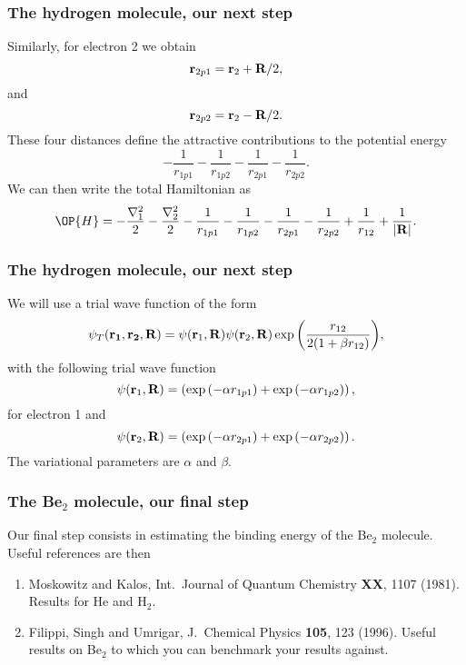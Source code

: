 \frame
{
  \frametitle{The hydrogen molecule, our next step}
\begin{small}
{\scriptsize
Similarly, for electron 2 we obtain
\[
{\bf r}_{2p1}={\bf r}_2+{\bf R}/2,
\]
and
\[
{\bf r}_{2p2}={\bf r}_2-{\bf R}/2.
\]
These four distances define the attractive contributions to the potential energy
\[
   -\frac{1}{r_{1p1}}-\frac{1}{r_{1p2}}-\frac{1}{r_{2p1}}-\frac{1}{r_{2p2}}.
\]
We can then write the total Hamiltonian as 
\[
   \OP{H}=-\frac{\nabla_1^2}{2}-\frac{\nabla_2^2}{2}
   -\frac{1}{r_{1p1}}-\frac{1}{r_{1p2}}-\frac{1}{r_{2p1}}-\frac{1}{r_{2p2}}
               +\frac{1}{r_{12}}+\frac{1}{|{\bf R}|}.
\]
}
\end{small}
}
\frame
{
  \frametitle{The hydrogen molecule, our next step}
\begin{small}
{\scriptsize
We will use a trial wave function of the form
\[
   \psi_{T}({\bf r_1},{\bf r_2}, {\bf R}) =
   \psi({\bf r}_1,{\bf R})\psi({\bf r}_2,{\bf R})
   \exp{\left(\frac{r_{12}}{2(1+\beta r_{12})}\right)},
\]
with the following trial wave function 
\[
   \psi({\bf r}_1,{\bf R})=\left(\exp{(-\alpha r_{1p1})}
      +\exp{(-\alpha r_{1p2})}\right),
\]
for electron 1 and
\[
   \psi({\bf r}_2,{\bf R})=\left(\exp{(-\alpha r_{2p1})}
      +\exp{(-\alpha r_{2p2})}\right).
\]
The variational parameters are $\alpha$ and $\beta$.

}
\end{small}
}
\frame
{
  \frametitle{The Be$_2$ molecule, our final step}
\begin{small}
{\scriptsize
Our final step consists in estimating the binding energy of the Be$_2$ molecule.
Useful references are then
\begin{enumerate}
\item Moskowitz and Kalos, Int.~Journal of Quantum Chemistry {\bf XX}, 1107 (1981).
Results for He and H$_2$.
\item Filippi, Singh and Umrigar, J.~Chemical Physics {\bf 105}, 123 (1996).   Useful results on
Be$_2$ to which you can benchmark your results against.
\end{enumerate}
}
\end{small}
}









